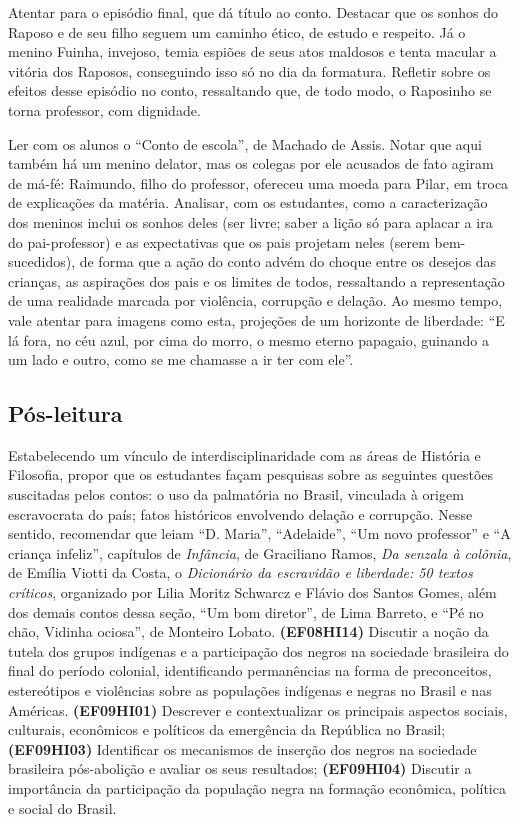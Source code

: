 Atentar para o episódio final, que dá título ao conto. Destacar que os
sonhos do Raposo e de seu filho seguem um caminho ético, de estudo e
respeito. Já o menino Fuinha, invejoso, temia espiões de seus atos
maldosos e tenta macular a vitória dos Raposos, conseguindo isso só no
dia da formatura. Refletir sobre os efeitos desse episódio no conto,
ressaltando que, de todo modo, o Raposinho se torna professor, com
dignidade.


Ler com os alunos o ``Conto de escola'', de Machado de Assis. Notar que
aqui também há um menino delator, mas os colegas por ele acusados de
fato agiram de má-fé: Raimundo, filho do professor, ofereceu uma moeda
para Pilar, em troca de explicações da matéria. Analisar, com os
estudantes, como a caracterização dos meninos inclui os sonhos deles
(ser livre; saber a lição só para aplacar a ira do pai-professor) e as
expectativas que os pais projetam neles (serem bem-sucedidos), de forma
que a ação do conto advém do choque entre os desejos das crianças, as
aspirações dos pais e os limites de todos, ressaltando a representação
de uma realidade marcada por violência, corrupção e delação. Ao mesmo
tempo, vale atentar para imagens como esta, projeções de um horizonte de
liberdade: ``E lá fora, no céu azul, por cima do morro, o mesmo eterno
papagaio, guinando a um lado e outro, como se me chamasse a ir ter com
ele''.

\subsection{Pós-leitura}

Estabelecendo um vínculo de interdisciplinaridade com as áreas de
História e Filosofia, propor que os estudantes façam pesquisas sobre as
seguintes questões suscitadas pelos contos: o uso da palmatória no
Brasil, vinculada à origem escravocrata do país; fatos históricos
envolvendo delação e corrupção. Nesse sentido, recomendar que leiam ``D.
Maria'', ``Adelaide'', ``Um novo professor'' e ``A criança infeliz'',
capítulos de \emph{Infância}, de Graciliano Ramos, \emph{Da senzala à
colônia}, de Emília Viotti da Costa, o \emph{Dicionário da escravidão e
liberdade: 50 textos críticos}, organizado por Lilia Moritz Schwarcz e
Flávio dos Santos Gomes, além dos demais contos dessa seção, ``Um bom
diretor'', de Lima Barreto, e ``Pé no chão, Vidinha ociosa'', de
Monteiro Lobato. \textbf{(EF08HI14)} Discutir a noção da tutela dos
grupos indígenas e a participação dos negros na sociedade brasileira do
final do período colonial, identificando permanências na forma de
preconceitos, estereótipos e violências sobre as populações indígenas e
negras no Brasil e nas Américas. \textbf{(EF09HI01)} Descrever e
contextualizar os principais aspectos sociais, culturais, econômicos e
políticos da emergência da República no Brasil; \textbf{(EF09HI03)}
Identificar os mecanismos de inserção dos negros na sociedade brasileira
pós-abolição e avaliar os seus resultados; \textbf{(EF09HI04)} Discutir
a importância da participação da população negra na formação econômica,
política e social do Brasil.

